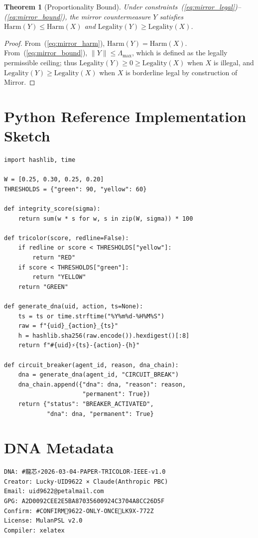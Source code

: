 \documentclass[conference]{IEEEtran}
\newtheorem{theorem}{Theorem}
\begin{document}
\begin{theorem}[Proportionality Bound]
Under constraints~(\ref{eq:mirror_legal})--(\ref{eq:mirror_bound}),
the mirror countermeasure $Y$ satisfies
$\text{Harm}(Y) \leq \text{Harm}(X)$ and
$\text{Legality}(Y) \geq \text{Legality}(X)$.
\end{theorem}

\begin{proof}
From~(\ref{eq:mirror_harm}), $\text{Harm}(Y) = \text{Harm}(X)$.
From~(\ref{eq:mirror_bound}), $\|Y\| \leq \Lambda_{\max}$, which is
defined as the legally permissible ceiling; thus
$\text{Legality}(Y) \geq 0 \geq \text{Legality}(X)$ when $X$ is
illegal, and $\text{Legality}(Y) \geq \text{Legality}(X)$
when $X$ is borderline legal by construction of Mirror.
\end{proof}

\section{Python Reference Implementation Sketch}

\begin{small}
\begin{verbatim}
import hashlib, time

W = [0.25, 0.30, 0.25, 0.20]
THRESHOLDS = {"green": 90, "yellow": 60}

def integrity_score(sigma):
    return sum(w * s for w, s in zip(W, sigma)) * 100

def tricolor(score, redline=False):
    if redline or score < THRESHOLDS["yellow"]:
        return "RED"
    if score < THRESHOLDS["green"]:
        return "YELLOW"
    return "GREEN"

def generate_dna(uid, action, ts=None):
    ts = ts or time.strftime("%Y%m%d-%H%M%S")
    raw = f"{uid}_{action}_{ts}"
    h = hashlib.sha256(raw.encode()).hexdigest()[:8]
    return f"#{uid}⚡️{ts}-{action}-{h}"

def circuit_breaker(agent_id, reason, dna_chain):
    dna = generate_dna(agent_id, "CIRCUIT_BREAK")
    dna_chain.append({"dna": dna, "reason": reason,
                      "permanent": True})
    return {"status": "BREAKER_ACTIVATED",
            "dna": dna, "permanent": True}
\end{verbatim}
\end{small}

\section{DNA Metadata}
\begin{small}
\begin{verbatim}
DNA: #龍芯⚡️2026-03-04-PAPER-TRICOLOR-IEEE-v1.0
Creator: Lucky·UID9622 × Claude(Anthropic PBC)
Email: uid9622@petalmail.com
GPG: A2D0092CEE2E5BA87035600924C3704A8CC26D5F
Confirm: #CONFIRM🌌9622-ONLY-ONCE🧬LK9X-772Z
License: MulanPSL v2.0
Compiler: xelatex
\end{verbatim}
\end{small}
\end{document}
